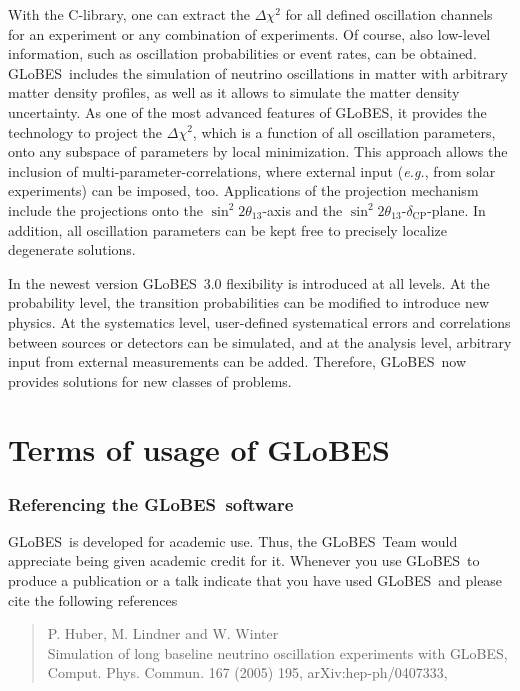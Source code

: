 \documentclass[a4paper,12pt,twoside]{book}
\newcommand{\glbxxx}{hep-ph/0407333}
\newcommand{\deltacp}{\delta_{\mathrm{CP}}}
\newcommand{\stheta}{\sin^2 2 \theta_{13}}
\newcommand{\eg}{{\it e.g.}}
\newcommand{\GLOBES}{{\sf GLoBES}}
\begin{document}
With the C-library, one can extract the $\Delta \chi^2$ for all defined 
oscillation channels for an experiment or any combination of experiments.
Of course, also low-level information, such as oscillation
probabilities or event rates, can be obtained. \GLOBES\ includes the
simulation of neutrino oscillations in matter with arbitrary matter 
density profiles, as well as it allows to simulate the matter density
uncertainty. As one of the most
advanced features of \GLOBES , it provides the technology to 
project the $\Delta \chi^2$, which is a function of all oscillation
parameters, onto any subspace of parameters by local minimization. 
This approach allows the inclusion of multi-parameter-correlations,
where external input (\eg, from solar experiments) can be imposed, too.
Applications of the projection mechanism include the projections onto the $\stheta$-axis and the $\stheta$-$\deltacp$-plane. In addition, all oscillation parameters can be kept free to precisely localize 
degenerate solutions.

In the newest version \GLOBES\ 3.0 flexibility is introduced at all levels. At the probability level,
the transition probabilities can be modified to introduce new physics. At the systematics level,
user-defined systematical errors and correlations between sources or detectors can be simulated,
and at the analysis level, arbitrary  input from external measurements can be added.
Therefore, \GLOBES\ now provides solutions for new classes of problems.

\chapter*{Terms of usage of \GLOBES}

\subsection*{Referencing the \GLOBES\ software}

\GLOBES\ is developed for academic use. Thus, the \GLOBES\ Team would
appreciate being given academic credit for it. Whenever you use \GLOBES\
to produce a publication or a talk indicate that you have used \GLOBES\ and
please cite the following references~\cite{globes_paper,globes_paper_two}
\begin{quote}
P. Huber, M. Lindner and W. Winter\\
Simulation of long baseline neutrino oscillation experiments with \GLOBES ,\\
Comput. Phys. Commun. 167 (2005) 195, arXiv:\glbxxx,
\end{quote}
\end{document}
